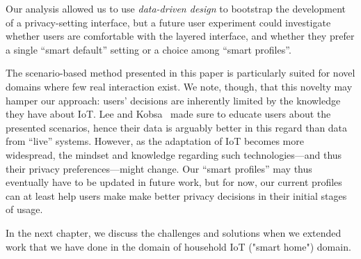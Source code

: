 Our analysis allowed us to use \emph{data-driven design} to bootstrap the development of a privacy-setting interface, but a future user experiment could investigate whether users are comfortable with the layered interface, and whether they prefer a single ``smart default'' setting or a choice among ``smart profiles''.

The scenario-based method presented in this paper is particularly suited for novel domains where few real interaction exist. We note, though, that this novelty may hamper our approach: users' decisions are inherently limited by the knowledge they have about IoT. Lee and Kobsa~\cite{lee2016understanding} made sure to educate users about the presented scenarios, hence their data is arguably better in this regard than data from ``live'' systems. However, as the adaptation of IoT becomes more widespread, the mindset and knowledge regarding such technologies---and thus their privacy preferences---might change. Our ``smart profiles'' may thus eventually have to be updated in future work, but for now, our current profiles can at least help users make make better privacy decisions in their initial stages of usage.

In the next chapter, we discuss the challenges and solutions when we extended work that we have done in the domain of household IoT ("smart home") domain.
